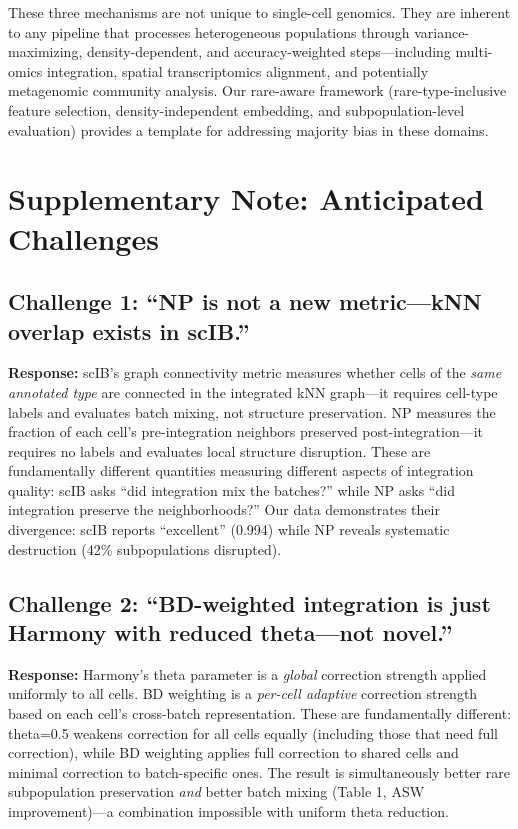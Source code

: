 These three mechanisms are not unique to single-cell genomics. They are inherent to any pipeline that processes heterogeneous populations through variance-maximizing, density-dependent, and accuracy-weighted steps---including multi-omics integration, spatial transcriptomics alignment, and potentially metagenomic community analysis. Our rare-aware framework (rare-type-inclusive feature selection, density-independent embedding, and subpopulation-level evaluation) provides a template for addressing majority bias in these domains.



\section*{Supplementary Note: Anticipated Challenges}

\subsection*{Challenge 1: ``NP is not a new metric---kNN overlap exists in scIB.''}

\textbf{Response:} scIB's graph connectivity metric measures whether cells of the \textit{same annotated type} are connected in the integrated kNN graph---it requires cell-type labels and evaluates batch mixing, not structure preservation. NP measures the fraction of each cell's pre-integration neighbors preserved post-integration---it requires no labels and evaluates local structure disruption. These are fundamentally different quantities measuring different aspects of integration quality: scIB asks ``did integration mix the batches?'' while NP asks ``did integration preserve the neighborhoods?'' Our data demonstrates their divergence: scIB reports ``excellent'' (0.994) while NP reveals systematic destruction (42\% subpopulations disrupted).

\subsection*{Challenge 2: ``BD-weighted integration is just Harmony with reduced theta---not novel.''}

\textbf{Response:} Harmony's theta parameter is a \textit{global} correction strength applied uniformly to all cells. BD weighting is a \textit{per-cell adaptive} correction strength based on each cell's cross-batch representation. These are fundamentally different: theta=0.5 weakens correction for all cells equally (including those that need full correction), while BD weighting applies full correction to shared cells and minimal correction to batch-specific ones. The result is simultaneously better rare subpopulation preservation \textit{and} better batch mixing (Table 1, ASW improvement)---a combination impossible with uniform theta reduction.

